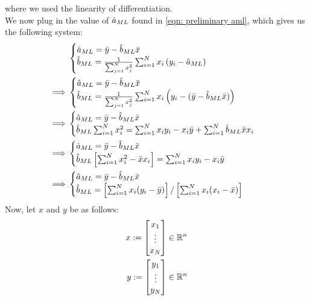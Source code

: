 \documentclass[12pt]{article}
\begin{document}
where we used the linearity of differentiation. \\
We now plug in the value of \(\hat a_{ML}\) found in \eqref{eqn: preliminary aml}, which gives us the following system:
\begin{align*}
             &
    \begin{cases}
        \hat a_{ML} = \bar{y} - \hat b_{ML} \bar{x} \\
        \hat b_{ML} = \frac{1}{\sum_{j=1}^N x_j^2} \sum_{i=1}^N x_i \left(y_i - \hat a_{ML} \right)
    \end{cases} \\
    \implies &
    \begin{cases}
        \hat a_{ML} = \bar{y} - \hat b_{ML} \bar{x} \\
        \hat b_{ML} = \frac{1}{\sum_{j=1}^N x_j^2} \sum_{i=1}^N x_i \left(y_i - (\bar{y} - \hat b_{ML} \bar{x}) \right)
    \end{cases} \\
    \implies &
    \begin{cases}
        \hat a_{ML} = \bar{y} - \hat b_{ML} \bar{x} \\
        \hat b_{ML} \sum_{i=1}^N x_i^2 = \sum_{i=1}^N x_i y_i - x_i\bar{y} + \sum_{i=1}^N\hat b_{ML} \bar{x}x_i
    \end{cases} \\
    \implies &
    \begin{cases}
        \hat a_{ML} = \bar{y} - \hat b_{ML} \bar{x} \\
        \hat b_{ML} \left[\sum_{i=1}^N x_i^2 - \bar{x}x_i\right] = \sum_{i=1}^N x_i y_i - x_i\bar{y}
    \end{cases} \\
    \implies &
    \begin{cases}
        \hat a_{ML} = \bar{y} - \hat b_{ML} \bar{x} \\
        \hat b_{ML} = \left[\sum_{i=1}^N x_i (y_i-\bar{y})\right] / \left[\sum_{i=1}^N x_i(x_i-\bar{x})\right]
    \end{cases} \\
\end{align*}
Now, let \(x\) and \(y\) be as follows:
\begin{align*}
    x :=
    \begin{bmatrix}
        x_1    \\
        \vdots \\
        x_N
    \end{bmatrix} \in \mathbb{R}^n \\
    y :=
    \begin{bmatrix}
        y_1    \\
        \vdots \\
        y_N
    \end{bmatrix} \in \mathbb{R}^n \\
\end{align*}
\end{document}
